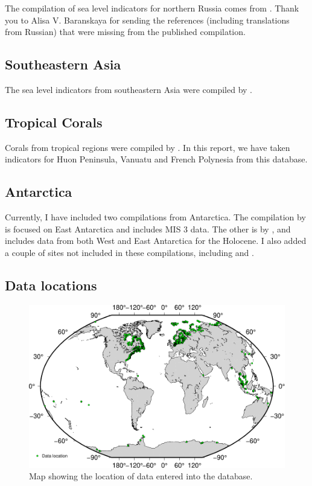 The compilation of sea level indicators for northern Russia comes from \citet{BaranskayaEtal2018}. Thank you to Alisa V. Baranskaya for sending the references (including translations from Russian) that were missing from the published compilation.

\subsection{Southeastern Asia}

The sea level indicators from southeastern Asia were compiled by \citet{MannEtal2019}.

\subsection{Tropical Corals}

Corals from tropical regions were compiled by \citet{HibbertEtal2016}. In this report, we have taken indicators for Huon Peninsula, Vanuatu and French Polynesia from this database.

\subsection{Antarctica}

Currently, I have included two compilations from Antarctica. The compilation by \citet{IshiwaEtal2021} is focused on East Antarctica and includes MIS 3 data. The other is by \citet{BriggsTarasov2013}, and includes data from both West and East Antarctica for the Holocene. I also added a couple of sites not included in these compilations, including \citet{HjortEtal1997} and \citet{BraddockEtal2022}.

\clearpage

\subsection{Data locations}

\begin{figure}[h]
\includegraphics[width=\textwidth]{../GIS/data_map.pdf}
\caption{Map showing the location of data entered into the database.}
\label{fig:data_map}
\end{figure}

\clearpage
